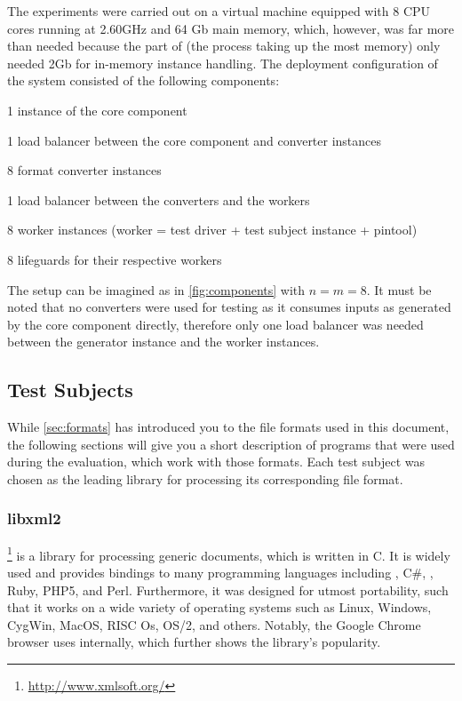 The experiments were carried out on a virtual machine equipped with 8 CPU cores running at 2.60GHz and 64 Gb
main memory, which, however, was far more than needed because the \java part of \xmlmate{} (the process taking
up the most memory) only needed 2Gb for in-memory \xml instance handling. The deployment configuration
of the \xmlmate system consisted of the following components:

\begin{itemize*}
  \item 1 instance of the \java \xmlmate core component
  \item 1 load balancer between the core component and converter instances
  \item 8 format converter instances
  \item 1 load balancer between the converters and the workers
  \item 8 worker instances (worker = test driver + test subject instance + pintool)
  \item 8 lifeguards for their respective workers
\end{itemize*}

The setup can be imagined as in \cref{fig:components} with $n = m = 8$.
It must be noted that no converters were used for testing \libxml as it consumes inputs as generated
by the \xmlmate core component directly, therefore only one load balancer was needed between the generator
instance and the worker instances.

\subsection{Test Subjects}
While \cref{sec:formats} has introduced you to the file formats used in this document, the following sections
will give you a short description of programs that were used during the evaluation, which work with those
formats. Each test subject was chosen as the leading library for processing its corresponding file format.
\tocless\subsubsection{libxml2}
\libxml\footnote{\url{http://www.xmlsoft.org/}} is a library for processing generic \xml documents,
which is written in {\small C}. It is widely used and provides bindings to many programming languages
including \cpp, {\small C\#}, \python{}, {\small Ruby}, {\small PHP5}, and {\small Perl}. Furthermore, it was
designed for utmost portability, such that it works on a wide variety of operating systems such as
Linux, Windows, CygWin, MacOS, RISC Os, OS/2, and others. Notably, the Google Chrome
browser uses \libxml internally, which further shows the library's popularity.

